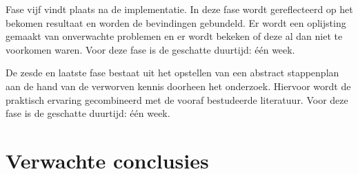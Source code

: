 \documentclass{hogent-article}
\begin{document}
Fase vijf vindt plaats na de implementatie. In deze fase wordt gereflecteerd op het bekomen resultaat en worden de bevindingen gebundeld. Er wordt een oplijsting gemaakt van onverwachte problemen en er wordt bekeken of deze al dan niet te voorkomen waren. Voor deze fase is de geschatte duurtijd: \'e\'en week.

De zesde en laatste fase bestaat uit het opstellen van een abstract stappenplan aan de hand van de verworven kennis doorheen het onderzoek. Hiervoor wordt de praktisch ervaring gecombineerd met de vooraf bestudeerde literatuur. Voor deze fase is de geschatte duurtijd: \'e\'en week.


\section{Verwachte conclusies}


\lipsum[14-18]


\printbibliography[heading=bibintoc]
\end{document}
